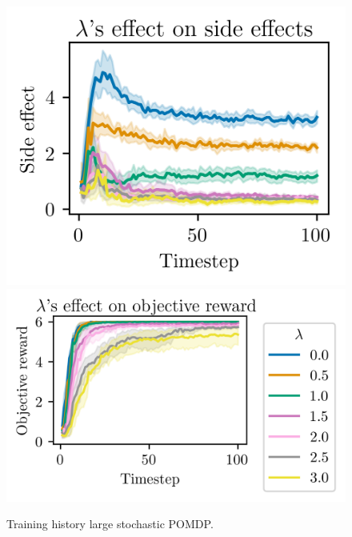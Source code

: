 \documentclass[12pt,A4]{report}
\theoremstyle{definition}
\begin{document}
\begin{appendices}
\begin{figure}[H]
  \centering
  \includegraphics{"./figures/pomdp_16x16_stochastic_side_effects.png"}
  \includegraphics{"./figures/pomdp_16x16_stochastic_objective_reward.png"}
  \caption{Training history large stochastic POMDP.}
  \label{fig:results_static_16x16_stochastic}
\end{figure}

\end{appendices}
\end{document}
